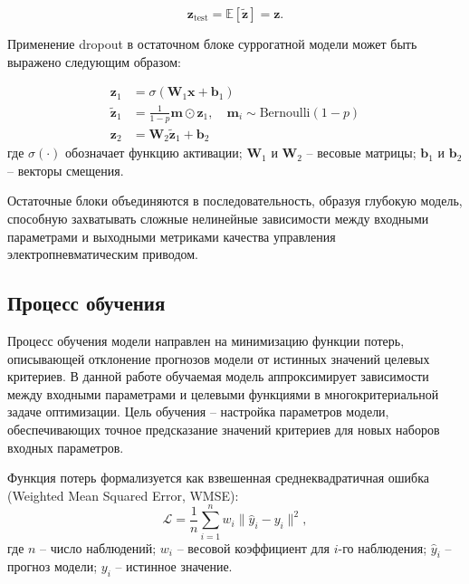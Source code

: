 \begin{equation}
    \mathbf{z}_{\text{test}} = \mathbb{E}[\tilde{\mathbf{z}}] = \mathbf{z}.
\end{equation}

Применение dropout в остаточном блоке суррогатной модели может быть выражено следующим образом:

\begin{equation}
    \begin{split}
        \mathbf{z}_1         & = \sigma(\mathbf{W}_1\mathbf{x} + \mathbf{b}_1)                                             \\
        \tilde{\mathbf{z}}_1 & = \frac{1}{1-p}\mathbf{m} \odot \mathbf{z}_1, \quad \mathbf{m}_i \sim \text{Bernoulli}(1-p) \\
        \mathbf{z}_2         & = \mathbf{W}_2\tilde{\mathbf{z}}_1 + \mathbf{b}_2
    \end{split}
\end{equation}
где $\sigma(\cdot)$ обозначает функцию активации;
$\mathbf{W}_1$ и $\mathbf{W}_2$ -- весовые матрицы;
$\mathbf{b}_1$ и $\mathbf{b}_2$ -- векторы смещения.

Остаточные блоки объединяются в последовательность, образуя глубокую модель, способную
захватывать сложные нелинейные зависимости между входными параметрами и выходными метриками
качества управления электропневматическим приводом.

\subsection{Процесс обучения}\label{sec:ch4/sec4/subsec2}

Процесс обучения модели направлен на минимизацию функции потерь,
описывающей отклонение прогнозов модели от истинных значений целевых критериев.
В данной работе обучаемая модель аппроксимирует зависимости между входными
параметрами и целевыми функциями в многокритериальной задаче оптимизации.
Цель обучения -- настройка параметров модели, обеспечивающих точное предсказание
значений критериев для новых наборов входных параметров.

Функция потерь формализуется как взвешенная среднеквадратичная ошибка (Weighted Mean Squared Error, WMSE):
\begin{equation}
\mathcal{L} = \frac{1}{n} \sum_{i=1}^n w_i \| \hat{y}_i - y_i \|^2,
\end{equation}
где $n$ -- число наблюдений;
$w_i$ -- весовой коэффициент для $i$-го наблюдения;
$\hat{y}_i$ -- прогноз модели;
$y_i$ -- истинное значение. 

